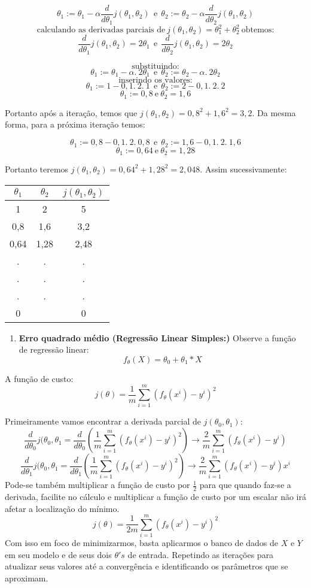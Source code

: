 \documentclass[
]{book}
\providecommand{\tightlist}{%
  \setlength{\itemsep}{0pt}\setlength{\parskip}{0pt}}
\begin{document}
\[\theta_1:=\theta_1-\alpha \frac{d}{d\theta_1}j(\theta_1,\theta_2) \ \ \mbox{e}\ \ \theta_2:=\theta_2-\alpha \frac{d}{d\theta_2}j(\theta_1,\theta_2)\]
\[\mbox{calculando as derivadas parciais de}\ j(\theta_1,\theta_2)=\theta_1^2+\theta_2^2\ \mbox{obtemos:}\]
\[\frac{d}{d\theta_1}j(\theta_1,\theta_2)=2\theta_1 \ \
\mbox{e}\ \ \frac{d}{d\theta_2}j(\theta_1,\theta_2)=2\theta_2\]

\[\mbox{substituindo:}\]
\[\theta_1:=\theta_1-\alpha.\ 2\theta_1 \ \ \mbox{e}\ \ \theta_2:=\theta_2-\alpha .\ 2\theta_2 \]
\[\mbox{inserindo os valores:}\]
\[\theta_1:=1-0,1.\ 2.\ 1 \ \ \mbox{e}\ \ \theta_2:=2-0,1.\ 2.\ 2\]
\[\theta_1:=0,8 \ \mbox{e} \ \theta_2=1,6\]

Portanto após a iteração, temos que \(j(\theta_1,\theta_2)=0,8^2+1,6^2=3,2\). Da mesma forma, para a próxima iteração temos:

\[\theta_1:=0,8-0,1.\ 2.\ 0,8 \ \ \mbox{e}\ \ \theta_2:=1,6-0,1.\ 2.\ 1,6\]
\[\theta_1:=0,64 \ \mbox{e} \ \theta_2=1,28\]

Portanto teremos \(j(\theta_1,\theta_2)=0,64^2+1,28^2=2,048\). Assim sucessivamente:

\begin{longtable}[]{@{}ccc@{}}
\toprule
\textbf{\(\theta_1\)} & \textbf{\(\theta_2\)} & \textbf{\(j(\theta_1,\theta_2)\)}\tabularnewline
\midrule
\endhead
1 & 2 & 5\tabularnewline
0,8 & 1,6 & 3,2\tabularnewline
0,64 & 1,28 & 2,48\tabularnewline
. & . & .\tabularnewline
. & . & .\tabularnewline
. & . & .\tabularnewline
0 & & 0\tabularnewline
\bottomrule
\end{longtable}

\begin{enumerate}
\def\labelenumi{\arabic{enumi}.}
\setcounter{enumi}{2}
\tightlist
\item
  \textbf{Erro quadrado médio (Regressão Linear Simples:)} Observe a função de regressão linear:
  \[f_\theta(X)=\theta_0+\theta_1*X\]
\end{enumerate}

A função de custo:
\[j(\theta)=\frac{1}{m}\displaystyle \sum^m_{i=1}(f_\theta(x^i)-y^i)^2\]

Primeiramente vamos encontrar a derivada parcial de \(j(\theta_0,\theta_1)\):
\[\frac{d}{d\theta_0}j(\theta_0,\theta_1=\frac{d}{d\theta_0}(\frac{1}{m}\displaystyle \sum^m_{i=1}(f_{\theta}(x^i)-y^i)^2) \rightarrow \frac{2}{m}\displaystyle \sum^m_{i=1}(f_\theta(x^i)-y^i) \]
\[\frac{d}{d\theta_1}j(\theta_0,\theta_1=\frac{d}{d\theta_1}(\frac{1}{m}\displaystyle \sum^m_{i=1}(f_{\theta}(x^i)-y^i)^2) \rightarrow \frac{2}{m}\displaystyle \sum^m_{i=1}(f_\theta(x^i)-y^i)x^i\]
Pode-se também multiplicar a função de custo por \(\frac{1}{2}\) para que quando faz-se a derivada, facilite no cálculo e multiplicar a função de custo por um escalar não irá afetar a localização do mínimo.
\[j(\theta)=\frac{1}{2m}\displaystyle \sum^m_{i=1}(f_\theta(x^i)-y^i)^2\]
Com isso em foco de minimizarmos, basta aplicarmos o banco de dados de \(X\) e \(Y\) em seu modelo e de seus dois \(\theta's\) de entrada. Repetindo as iterações para atualizar seus valores até a convergência e identificando os parâmetros que se aproximam.
\end{document}
